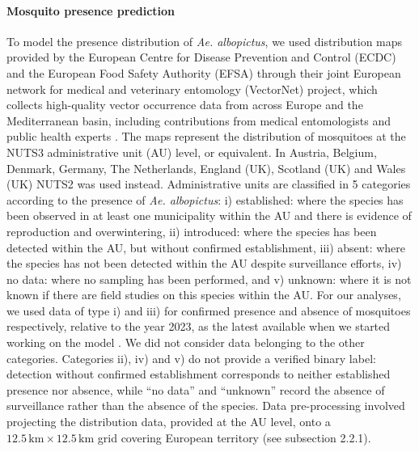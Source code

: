\documentclass[preprint,12pt]{elsarticle}
\begin{document}
\paragraph{Mosquito presence prediction}
To model the presence distribution of \emph{Ae. albopictus}, we used distribution maps \cite{ecdc2024b} provided by the European Centre for Disease Prevention and Control (ECDC)  and the European Food Safety Authority (EFSA) through their joint European network for medical and veterinary entomology (VectorNet) project, which collects high-quality vector occurrence data from across Europe and the Mediterranean basin, including contributions from medical entomologists and public health experts \cite{Wint2023}. 
The maps represent the distribution of mosquitoes at the NUTS3 administrative unit (AU) level, or equivalent. In Austria, Belgium, Denmark, Germany, The Netherlands, England (UK), Scotland (UK) and Wales (UK) NUTS2 was used instead. Administrative units are classified in 5 categories according to the presence of \emph{Ae. albopictus}: i) established: where the species has been observed in at least one municipality within the AU and there is evidence of reproduction and overwintering, ii) introduced: where the species has been detected within the AU, but without confirmed establishment, iii) absent: where the species has not been detected within the AU despite surveillance efforts, iv) no data: where no sampling has been performed, and v) unknown: where it is not known if there are field studies on this species within the AU. For our analyses, we used data of type i) and iii) for confirmed presence and absence of mosquitoes respectively, relative to the year 2023, as the latest available when we started working on the model \cite{biazzo2026_datasets}. We did not consider data belonging to the other categories. Categories ii), iv) and v) do not provide a verified binary label: detection without confirmed establishment corresponds to neither established presence nor absence, while ``no data'' and ``unknown'' record the absence of surveillance rather than the absence of the species.
Data pre-processing involved projecting the distribution data, provided at the AU level, onto a $12.5\,\text{km} \times 12.5\,\text{km}$ grid covering European territory (see subsection 2.2.1). 
\end{document}
